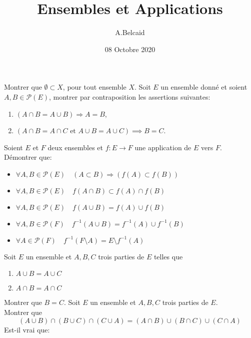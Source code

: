 \documentclass[10pt, a4paper, twocolumn]{homework}
\title{Ensembles et Applications}
\date{08 Octobre 2020}
\author{A.Belcaid}
\begin{document}
\maketitle

Montrer que $\emptyset \subset X$, pour tout ensemble $X$.
  Soit $E$ un ensemble donné et soient $A,B \in \mathcal{P}(E)$,  montrer par contraposition les assertions suivantes:
\begin{enumerate}
\item $(A\cap B=A\cup B)\Rightarrow A=B$,
\item $ (A\cap B=A\cap C \text{ et } A\cup B=A\cup C)\implies B=C$.
\end{enumerate}
Soient $E$ et $F$ deux ensembles et $f:E\rightarrow F$ une application de $E$ vers $F$.\\

Démontrer que:

\begin{itemize}
  \item $\forall A,B \in \mathcal{P}(E) \quad (A\subset B)\Rightarrow (f(A)\subset f(B))$
  \item $\forall A,B \in \mathcal{P}(E) \quad f(A\cap B)\subset f(A)\cap f(B)$
  \item $\forall A,B \in \mathcal{P}(E) \quad f(A\cup B) = f(A)\cup f(B)$
  \item $\forall A,B \in \mathcal{P}(F) \quad f^{-1}(A\cup B) = f^{-1}(A)\cup f^{-1}(B)$
  \item $\forall A \in \mathcal{P}(F) \quad f^{-1}(F\setminus A)=E\setminus f^{-1}(A)$
\end{itemize}

Soit $E$ un ensemble et $A, B, C$ trois parties de $E$ telles que
\begin{enumerate}
  \item $A \cup B = A \cup C$
  \item $A \cap B = A \cap C$
\end{enumerate}
Montrer que $B = C$.
Soit $E$ un ensemble et $A, B, C$ trois parties de $E$.\\
Montrer que
$$ (A \cup B) \cap (B \cup C) \cap (C \cup A) =
(A \cap B) \cup (B \cap C) \cup (C \cap A)$$
Est-il vrai que:
\end{document}
